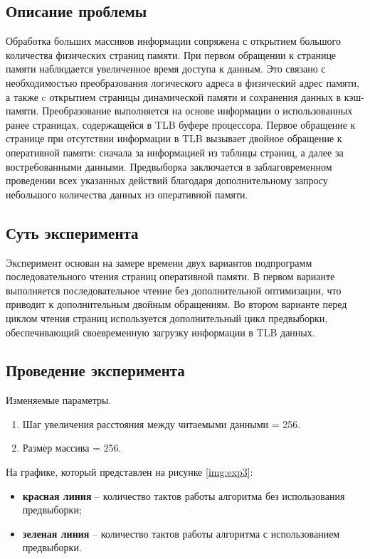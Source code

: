 \subsection{Описание проблемы}
Обработка больших массивов информации сопряжена с открытием большого количества физических страниц памяти.  При первом обращении к странице памяти наблюдается   увеличенное время доступа к данным. Это связано с необходимостью преобразования логического адреса в физический адрес памяти, а также c открытием   страницы   динамической   памяти   и   сохранения   данных   в   кэш-памяти. Преобразование выполняется на основе информации о использованных ранее страницах, содержащейся в TLB буфере процессора. Первое обращение к странице при отсутствии информации   в  TLB  вызывает двойное обращение к оперативной памяти: сначала за информацией из таблицы страниц, а далее за востребованными данными.   Предвыборка заключается   в   заблаговременном   проведении   всех   указанных   действий   благодаря дополнительному запросу небольшого количества данных из оперативной памяти.

\subsection{Суть эксперимента}  
Эксперимент основан на замере времени двух вариантов подпрограмм последовательного чтения страниц оперативной памяти. В первом варианте выполняется последовательное чтение без дополнительной оптимизации, что приводит к дополнительным двойным обращениям. Во втором варианте перед циклом чтения страниц используется   дополнительный   цикл   предвыборки,   обеспечивающий   своевременную загрузку информации в TLB данных. 


\subsection{Проведение эксперимента}

Изменяемые параметры.

\begin{enumerate}
	\item Шаг увеличения расстояния между читаемыми данными = 256.
	\item Размер массива = 256.
\end{enumerate}

На графике, который представлен на рисунке \ref{img:exp3}:
\begin{itemize}
	\item \textbf{красная линия} -- количество тактов работы алгоритма без использования предвыборки;
	\item \textbf{зеленая линия} -- количество тактов работы алгоритма с использованием предвыборки.
\end{itemize}


